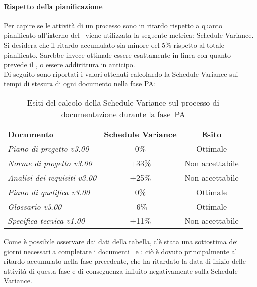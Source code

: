 \documentclass[../PianoDiQualifica.tex]{subfiles}
\begin{document}
\begin{appendices}
			\paragraph{Rispetto della pianificazione}
			Per capire se le attività di un processo sono in ritardo rispetto a quanto pianificato all'interno del \pianodiprogetto\ viene utilizzata la seguente metrica: Schedule Variance.\\
			Si desidera che il ritardo accumulato sia minore del 5\% rispetto al totale pianificato. Sarebbe invece ottimale essere esattamente in linea con quanto prevede il \pianodiprogetto, o essere addirittura in anticipo.\\
			Di seguito sono riportati i valori ottenuti calcolando la Schedule Variance sui tempi di stesura di ogni documento nella fase PA:
			\begin{table}[H]
				\centering
				\begin{tabular}{l * {2}{c}}
					\toprule
					\textbf{Documento} & \textbf{Schedule Variance} & \textbf{Esito} \\
					\midrule
					\textit{Piano di progetto v3.00} & 0\% &  Ottimale \\
					\textit{Norme di progetto v3.00} & +33\% & Non accettabile \\
					\textit{Analisi dei requisiti v3.00} & +25\% & Non accettabile \\
					\textit{Piano di qualifica v3.00} & 0\% & Ottimale \\
					\textit{Glossario v3.00} & -6\% & Ottimale \\
					\textit{Specifica tecnica v1.00} & +11\% & Non accettabile \\
					\bottomrule
				\end{tabular}
				\caption{Esiti del calcolo della Schedule Variance sul processo di documentazione durante la fase\g\ PA}
				\label{tab:esiti_schedule_variance}
			\end{table}
			Come è possibile osservare dai dati della tabella, c'è stata una sottostima dei giorni necessari a completare i documenti \normediprogetto\ e \analisideirequisiti: ciò è dovuto principalmente al ritardo accumulato nella fase precedente, che ha ritardato la data di inizio delle attività di questa fase e di conseguenza influito negativamente sulla Schedule Variance.
			

\end{appendices}
\end{document}
